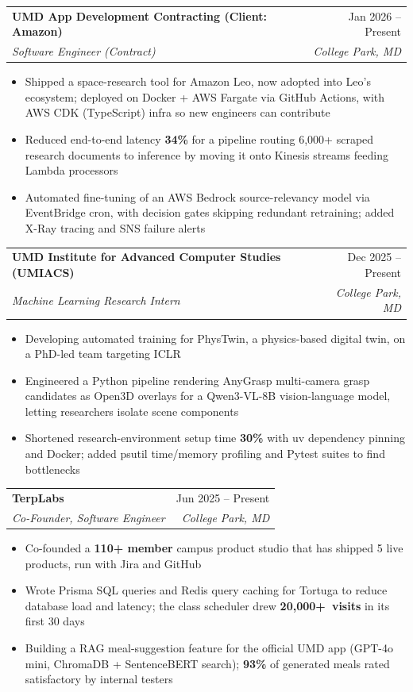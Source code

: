 \documentclass[letterpaper,10pt]{article}
\makeatletter
\newcommand{\resumeItem}[1]{\item{#1}\vspace{-1pt}}
\newcommand{\resumeSubheading}[4]{%
  \vspace{-1pt}\item
  \begin{tabular*}{\textwidth}[t]{l@{\extracolsep{\fill}}r}
    \textbf{#1} & #2 \\
    \textit{#3} & \textit{#4} \\
  \end{tabular*}\vspace{-6pt}%
}
\newcommand{\resumeItemListStart}{\begin{itemize}[leftmargin=0.18in, itemsep=0pt, topsep=1pt, parsep=0pt]}
\newcommand{\resumeItemListEnd}{\end{itemize}\vspace{2pt}}
\makeatother
\begin{document}
  \resumeSubheading
    {UMD App Development Contracting (Client: Amazon)}{Jan 2026 -- Present}
    {Software Engineer (Contract)}{College Park, MD}
  \resumeItemListStart
    \resumeItem{Shipped a space-research tool for Amazon Leo, now adopted into Leo's ecosystem; deployed on Docker + AWS Fargate via GitHub Actions, with AWS CDK (TypeScript) infra so new engineers can contribute}
    \resumeItem{Reduced end-to-end latency \textbf{34\%} for a pipeline routing 6,000+ scraped research documents to inference by moving it onto Kinesis streams feeding Lambda processors}
    \resumeItem{Automated fine-tuning of an AWS Bedrock source-relevancy model via EventBridge cron, with decision gates skipping redundant retraining; added X-Ray tracing and SNS failure alerts}
  \resumeItemListEnd

  \resumeSubheading
    {UMD Institute for Advanced Computer Studies (UMIACS)}{Dec 2025 -- Present}
    {Machine Learning Research Intern}{College Park, MD}
  \resumeItemListStart
    \resumeItem{Developing automated training for PhysTwin, a physics-based digital twin, on a PhD-led team targeting ICLR}
    \resumeItem{Engineered a Python pipeline rendering AnyGrasp multi-camera grasp candidates as Open3D overlays for a Qwen3-VL-8B vision-language model, letting researchers isolate scene components}
    \resumeItem{Shortened research-environment setup time \textbf{30\%} with uv dependency pinning and Docker; added psutil time/memory profiling and Pytest suites to find bottlenecks}
  \resumeItemListEnd

  \resumeSubheading
    {TerpLabs}{Jun 2025 -- Present}
    {Co-Founder, Software Engineer}{College Park, MD}
  \resumeItemListStart
    \resumeItem{Co-founded a \textbf{110+ member} campus product studio that has shipped 5 live products, run with Jira and GitHub}
    \resumeItem{Wrote Prisma SQL queries and Redis query caching for Tortuga to reduce database load and latency; the class scheduler drew \mbox{\textbf{20,000+ visits}} in its first 30 days}
    \resumeItem{Building a RAG meal-suggestion feature for the official UMD app (GPT-4o mini, ChromaDB + SentenceBERT search); \textbf{93\%} of generated meals rated satisfactory by internal testers}
  \resumeItemListEnd
\end{document}
